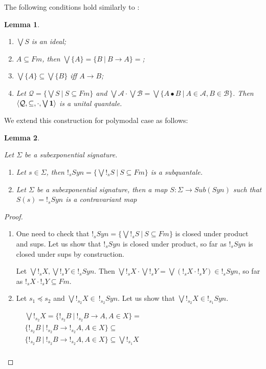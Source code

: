 \documentclass[a4paper]{article}
\theoremstyle{defin}
\theoremstyle{theorem}
\theoremstyle{prop}
\theoremstyle{lemma}
\newtheorem{lemma}{Lemma}
\theoremstyle{ex}
\theoremstyle{col}
\begin{document}
The following conditions hold similarly to \cite{Gurr}:

\begin{lemma}
$ $

  \begin{enumerate}
  \item $\bigvee S$ is an ideal;
  \item $A \subseteq Fm$, then $\bigvee \{ A \} = \{ B \: | \: B \rightarrow A \} = $;
  \item $\bigvee \{ A \} \subseteq \bigvee \{ B \}$ iff $A \rightarrow B$;
  \item Let $\mathcal{Q} = \{ \bigvee S \: | \: S \subseteq Fm \}$ and $\bigvee \mathcal{A} \cdot \bigvee \mathcal{B} =
  \bigvee \{ A \bullet B \: | \: A \in \mathcal{A}, B \in \mathcal{B} \}$.
  Then $\langle \mathcal{Q}, \subseteq, \cdot, \bigvee{{\bf 1}}\rangle$ is a unital quantale.
  \end{enumerate}
\end{lemma}

We extend this construction for polymodal case as follows:

\begin{lemma}
$ $

Let $\Sigma$ be a subexponential signature.
  \begin{enumerate}
  \item Let $s \in \Sigma$, then $!_s Syn = \{ \bigvee !_s S \: | \: S \subseteq Fm \}$ is a subquantale.
  \item Let $\Sigma$ be a subexponential signature, then a map $S : \Sigma \to Sub(Syn)$ such that $S(s) = !_s Syn$ is a contravariant map
  \end{enumerate}
\end{lemma}

\begin{proof}
$ $

\begin{enumerate}
    \item One need to check that $!_s Syn = \{ \bigvee !_s S \: | \: S \subseteq Fm \}$ is closed under product and sups. Let us show that $!_s Syn$ is closed under product, so far as $!_s Syn$ is closed under sups by construction.

    Let $\bigvee !_s X, \bigvee !_s Y \in !_s Syn$. Then $\bigvee !_s X \cdot \bigvee !_s Y = \bigvee (!_s X \cdot !_s Y) \in !_s Syn$, so far as $!_s X \cdot !_s Y \subseteq Fm$.

    \item Let $s_1 \preceq s_2$ and $\bigvee !_{s_2} X \in \: !_{s_2} Syn$. Let us show that $\bigvee !_{s_2} X \in !_{s_1} Syn$.

    $\begin{array}{lll}
    & \bigvee !_{s_2} X = \{ !_{s_2} B \: | \: !_{s_2} B \to A, A \in X \} = & \\
    & \{ !_{s_2} B \: | \: !_{s_2} B \to !_{s_2} A, A \in X \} \subseteq & \\
    & \{ !_{s_2} B \: | \: !_{s_2} B \to !_{s_2} A, A \in X \} \subseteq \bigvee !_{s_1} X& \\
    \end{array}$
  \end{enumerate}
\end{proof}
\end{document}

